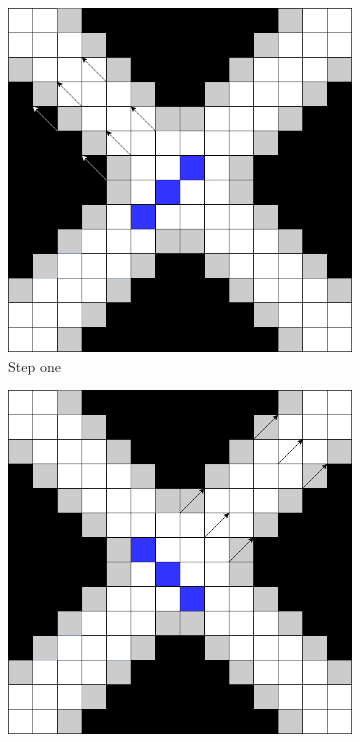 \documentclass[../Head/Main.tex]{subfiles}
\begin{document}
\begin{figure}[H]
    \centering
    \begin{subfigure}{.24\textwidth}
        \centering
        \includegraphics[width=\textwidth]{../Figures/screening_algorithm/peak_search_step1.png}
        \caption{Step one}
        \label{fig:peak_search_step1}
    \end{subfigure}
    \hfill
    \begin{subfigure}{.24\textwidth}
        \centering
        \includegraphics[width=\textwidth]{../Figures/screening_algorithm/peak_search_step2.png}

\end{subfigure}
\end{figure}
\end{document}
